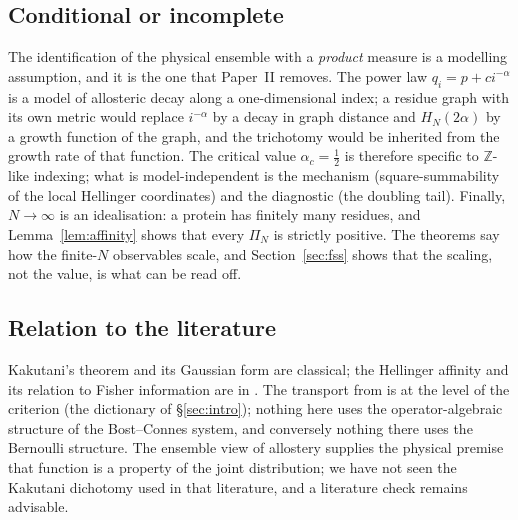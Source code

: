 \documentclass[11pt,reqno]{amsart}
\theoremstyle{plain}
\theoremstyle{definition}
\theoremstyle{remark}
\numberwithin{equation}{section}
\begin{document}
\subsection*{Conditional or incomplete}
The identification of the physical ensemble with a \emph{product} measure is a modelling assumption, and it is the one that Paper~II removes. The power law $q_i=p+ci^{-\alpha}$ is a model of allosteric decay along a one-dimensional index; a residue graph with its own metric would replace $i^{-\alpha}$ by a decay in graph distance and $H_N(2\alpha)$ by a growth function of the graph, and the trichotomy would be inherited from the growth rate of that function. The critical value $\alpha_c=\frac12$ is therefore specific to $\mathbb Z$-like indexing; what is model-independent is the mechanism (square-summability of the local Hellinger coordinates) and the diagnostic (the doubling tail). Finally, $N\to\infty$ is an idealisation: a protein has finitely many residues, and Lemma~\ref{lem:affinity} shows that every $\Pi_N$ is strictly positive. The theorems say how the finite-$N$ observables scale, and Section~\ref{sec:fss} shows that the scaling, not the value, is what can be read off.

\subsection*{Relation to the literature}
Kakutani's theorem \cite{Kakutani1948} and its Gaussian form \cite{Feldman1958,Hajek1958} are classical; the Hellinger affinity and its relation to Fisher information are in \cite{Hellinger1909,Bhattacharyya1943,LeCam1986}. The transport from \cite{Chen2026} is at the level of the criterion (the dictionary of \S\ref{sec:intro}); nothing here uses the operator-algebraic structure of the Bost--Connes system, and conversely nothing there uses the Bernoulli structure. The ensemble view of allostery \cite{Motlagh2014,Nussinov2013} supplies the physical premise that function is a property of the joint distribution; we have not seen the Kakutani dichotomy used in that literature, and a literature check remains advisable.
\end{document}

